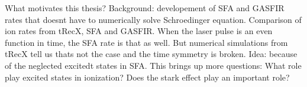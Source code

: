 What motivates this thesis? Background: developement of SFA and GASFIR rates that doesnt have to numerically solve Schroedinger equation.
Comparison of ion rates from tRecX, SFA and GASFIR. When the laser pulse is an even function in time, the SFA rate is that as well. 
But numerical simulations from tRecX tell us thats not the case and the time symmetry is broken. Idea: because of the neglected excitedt states in SFA.
This brings up more questions: What role play excited states in ionization? Does the stark effect play an important role?